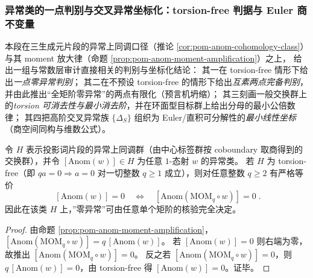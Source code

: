 \subsubsection{异常类的一点判别与交叉异常坐标化：torsion-free 判据与 Euler 商不变量}\label{subsubsec:pom-anom-torsionfree-euler-quotient}
本段在三生成元片段的异常上同调口径（推论 \ref{cor:pom-anom-cohomology-class}）与其 moment 放大律（命题 \ref{prop:pom-anom-moment-amplification}）之上，
给出一组与常数层审计直接相关的判别与坐标化结论：
其一在 torsion-free 情形下给出\emph{一点零异常判别}；
其二在不预设 torsion-free 的情形下给出\emph{互素两点完备判别}，并由此推出“全矩阶零异常”的两点有限化（预言机坍缩）；
其三刻画一般交换群上的\emph{torsion 可消去性与最小消去阶}，并在环面型目标群上给出分母的最小公倍数律；
其四把高阶交叉异常族 \(\{\Delta_S\}\) 组织为 Euler/直积可分解性的\emph{最小线性坐标}（商空间同构与维数公式）。

\begin{corollary}\label{cor:pom-anom-one-point-zero-test}
令 \(H\) 表示投影词片段的异常上同调群（由中心标签群按 coboundary 取商得到的交换群），并令 \([\mathrm{Anom}(w)]\in H\) 为任意 \(1\)-态射 \(w\) 的异常类。
若 \(H\) 为 torsion-free（即 \(qa=0\Rightarrow a=0\) 对一切整数 \(q\ge 1\) 成立），则对任意整数 \(q\ge 2\) 有严格等价
\[
\boxed{\;
[\mathrm{Anom}(w)]=0\quad\Longleftrightarrow\quad [\mathrm{Anom}(\mathrm{MOM}_q\circ w)]=0\; }.
\]
因此在该类 \(H\) 上，”零异常”可由任意单个矩阶的核验完全决定。
\end{corollary}
\begin{proof}
由命题 \ref{prop:pom-anom-moment-amplification}，
\(
[\mathrm{Anom}(\mathrm{MOM}_q\circ w)]=q\,[\mathrm{Anom}(w)]
\)。
若 \([\mathrm{Anom}(w)]=0\) 则右端为零，故推出 \([\mathrm{Anom}(\mathrm{MOM}_q\circ w)]=0\)。
反之若 \([\mathrm{Anom}(\mathrm{MOM}_q\circ w)]=0\)，则 \(q\,[\mathrm{Anom}(w)]=0\)，由 torsion-free 得 \([\mathrm{Anom}(w)]=0\)。证毕。
\end{proof}

